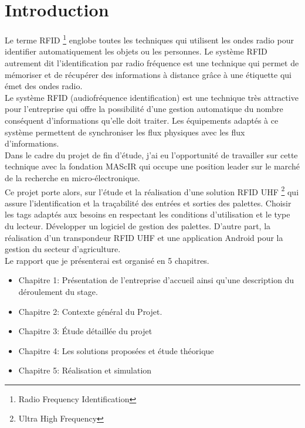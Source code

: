 \documentclass[11pt, a4paper, twoside]{book}
\begin{document}
\listoffigures

\listoftables

\chapter*{Introduction}
Le terme RFID \footnote{Radio Frequency Identification} englobe toutes les techniques qui utilisent les ondes radio pour identifier automatiquement les objets ou les personnes. Le système RFID autrement dit l'identification par radio fréquence est une technique qui permet de mémoriser et de récupérer des informations à distance grâce à une étiquette qui émet des ondes radio.\\

Le système RFID (audiofréquence identification) est une technique très attractive pour l'entreprise qui offre la possibilité d'une gestion automatique du nombre conséquent d'informations qu'elle doit traiter. Les équipements adaptés à ce système permettent de synchroniser les flux physiques avec les flux d'informations.\\

Dans le cadre du projet de fin d'étude, j'ai eu l'opportunité de travailler sur cette technique avec la fondation MAScIR qui occupe une position leader sur le marché de la recherche en micro-électronique.\\

Ce projet porte alors, sur l'étude et la réalisation d’une solution RFID UHF \footnote{Ultra High Frequency} qui assure l’identification et la traçabilité des entrées et sorties des palettes. Choisir les tags adaptés aux besoins en respectant les conditions d’utilisation et le type du lecteur. Développer un logiciel de gestion des palettes. D’autre part, la réalisation d’un transpondeur RFID UHF et une application Android pour la gestion du secteur d'agriculture.\\


Le rapport que je présenterai est organisé en 5 chapitres.

\begin{itemize}
\item Chapitre 1: Présentation de l'entreprise d'accueil ainsi qu'une description du déroulement du stage.
\item Chapitre 2: Contexte général du Projet.
\item Chapitre 3: Étude détaillée du projet 
\item Chapitre 4: Les solutions proposées et étude théorique
\item Chapitre 5: Réalisation et simulation
\end{itemize}
\end{document}
